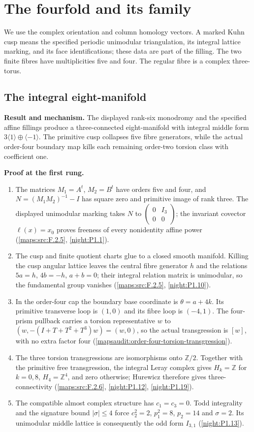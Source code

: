 \documentclass[11pt,a4paper]{article}
\theoremstyle{definition}
\newcommand{\RungZero}[1]{\par\noindent\textbf{Result and mechanism.} #1\par\smallskip}
\newcommand{\RungOne}{\par\Needspace{6\baselineskip}\noindent\textbf{Proof at the first rung.}\par\nobreak\smallskip}
\begin{document}
\section{The fourfold and its family}
\label{sec:V-results}

We use the complex orientation and column homology vectors.  A marked
Kuhn cusp means the specified periodic unimodular triangulation, its
integral lattice marking, and its face identifications; these data are
part of the filling.  The two finite fibres have multiplicities five
and four.  The regular fibre is a complex three-torus.

\subsection{The integral eight-manifold}
\RungZero{The displayed rank-six monodromy and the specified affine
fillings produce a three-connected eight-manifold with integral middle
form $3\langle1\rangle\oplus\langle-1\rangle$.  The primitive cusp
collapses five fibre generators, while the actual order-four boundary
map kills each remaining order-two torsion class with coefficient one.}
\RungOne
\begin{enumerate}[label=\arabic*.]
\item The matrices $M_1=A^t$, $M_2=B^t$ have orders five and four, and
  $N=(M_1M_2)^{-1}-I$ has square zero and primitive image of rank three.
  The displayed unimodular marking takes $N$ to
  $\left(\begin{smallmatrix}0&I_3\\0&0\end{smallmatrix}\right)$;
  the invariant covector $\ell(x)=x_0$ proves freeness of every
  nonidentity affine power
  (\cref{maps:src:F.2.5}, \cref{night:P1.1}).
\item The cusp and finite quotient charts glue to a closed smooth
  manifold.  Killing the cusp angular lattice leaves the central fibre
  generator $h$ and the relations $5a=h$, $4b=-h$, $a+b=0$;
  their integral relation matrix is unimodular, so the fundamental
  group vanishes (\cref{maps:src:F.2.5}, \cref{night:P1.10}).
\item In the order-four cap the boundary base coordinate is
  $\theta=a+4k$.  Its primitive transverse loop is $(1,0)$ and its
  fibre loop is $(-4,1)$.  The four-prism pullback carries a torsion
  representative $w$ to $(w,-(I+T+T^2+T^3)w)=(w,0)$, so the actual
  transgression is $[w]$, with no extra factor four
  (\cref{mapsaudit:order-four-torsion-transgression}).
\item The three torsion transgressions are isomorphisms onto
  $\mathbb Z/2$.  Together with the primitive free transgression,
  the integral Leray complex gives
  $H_k=\mathbb Z$ for $k=0,8$, $H_4=\mathbb Z^4$, and zero otherwise;
  Hurewicz therefore gives three-connectivity
  (\cref{maps:src:F.2.6}, \cref{night:P1.12}, \cref{night:P1.19}).
\item The compatible almost complex structure has $c_1=c_3=0$.
  Todd integrality and the signature bound $|\sigma|\leq4$ force
  $c_2^2=2$, $p_1^2=8$, $p_2=14$ and $\sigma=2$.
  Its unimodular middle lattice is consequently the odd form
  $I_{3,1}$ (\cref{night:P1.13}).
\end{enumerate}
\end{document}
